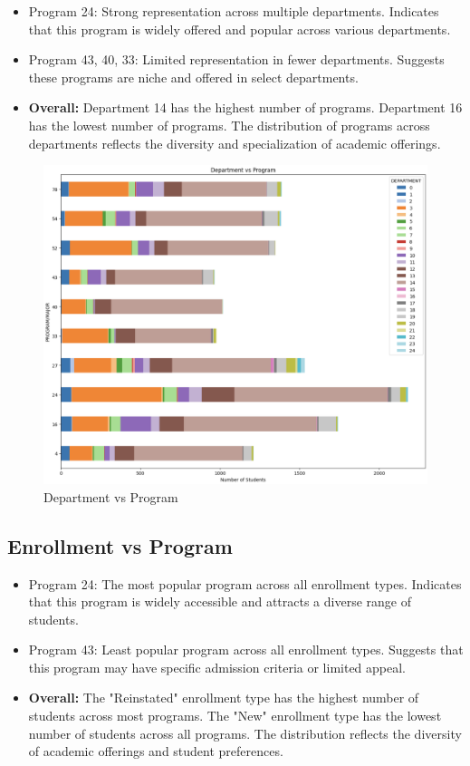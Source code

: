 \documentclass[12pt]{article}
\begin{document}
\begin{itemize}
    \item Program 24: Strong representation across multiple departments. Indicates that this program is widely offered and popular across various departments.

    \item Program 43, 40, 33: Limited representation in fewer departments. Suggests these programs are niche and offered in select departments.
    
    \item \textbf{Overall: }Department 14 has the highest number of programs. Department 16 has the lowest number of programs. The distribution of programs across departments reflects the diversity and specialization of academic offerings.
\end{itemize}

\begin{figure}[H]
    \centering
    \includegraphics[width=1\linewidth]{department_vs_program.png}
    \caption{Department vs Program}
\end{figure}

\subsection{Enrollment vs Program}

\begin{itemize}
    \item Program 24: The most popular program across all enrollment types. Indicates that this program is widely accessible and attracts a diverse range of students.

    \item Program 43: Least popular program across all enrollment types. Suggests that this program may have specific admission criteria or limited appeal.
    
    \item \textbf{Overall: }The "Reinstated" enrollment type has the highest number of students across most programs. The "New" enrollment type has the lowest number of students across all programs. The distribution reflects the diversity of academic offerings and student preferences.
\end{itemize}
\end{document}
